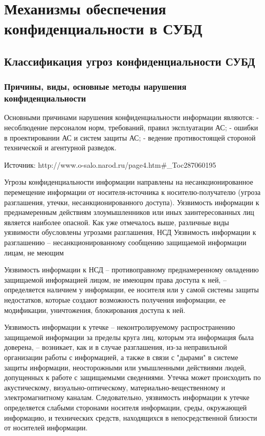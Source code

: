 \section{Механизмы обеспечения конфиденциальности в СУБД}
\subsection{Классификация угроз конфиденциальности СУБД}

\subsubsection{Причины, виды, основные методы нарушения конфиденциальности}

Основными причинами нарушения конфиденциальности информации являются:
-     несоблюдение персоналом норм, требований, правил эксплуатации АС;
-     ошибки в проектировании АС и систем защиты АС;
-     ведение противостоящей стороной технической и агентурной разведок.


Источник: http://www.o-salo.narod.ru/page4.htm\#\_Toc287060195

Угрозы конфиденциальности информации направлены на несанкционированное перемещение информации от носителя-источника к носителю-получателю (угроза разглашения, утечки, несанкционированного доступа).
Уязвимость информации к преднамеренным действиям злоумышленников или иных заинтересованных лиц является наиболее опасной. Как уже отмечалось выше, различные виды уязвимости обусловлены угрозами разглашения, НСД %
Уязвимость информации к разглашению – несанкционированному сообщению защищаемой информации лицам, не меющим %

Уязвимость информации к НСД – противоправному преднамеренному овладению защищаемой информацией лицом, не имеющим права доступа к ней, – определяется наличием у информации, ее носителя или у самой системы защиты недостатков, которые создают возможность получения информации, ее модификации, уничтожения, блокирования доступа к ней.

Уязвимость информации к утечке – неконтролируемому распространению защищаемой информации за пределы круга лиц, которым эта информация была доверена, – возникает, как и в случае разглашения, из-за неправильной организации работы с информацией, а также в связи с "дырами" в системе защиты информации, неосторожными или умышленными действиями людей, допущенных к работе с защищаемыми сведениями. Утечка может происходить по акустическому, визуально-оптическому, материально-вещественному и электромагнитному каналам. Следовательно, уязвимость информации к утечке определяется слабыми сторонами носителя информации, среды, окружающей информацию, и технических средств, находящихся в непосредственной близости от носителей информации.

